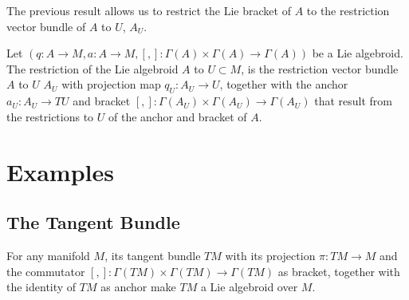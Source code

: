 The previous result allows us to restrict the Lie bracket of $A$ to the restriction vector bundle of $A$ to $U$, $A_U$.

\begin{definition}
Let $(q:A \to M, a: A \to M, [,]:\Gamma(A)\times \Gamma(A) \to \Gamma(A))$ be a Lie algebroid. The restriction of the Lie algebroid $A$ to $U \subset M$, is the restriction vector bundle $A$ to $U$ $A_U$ with projection map $q_U: A_U \to U$, together with the anchor $a_U:A_U \to TU$ and bracket $[,]:\Gamma(A_U)\times \Gamma(A_U) \to \Gamma(A_U)$ that result from the restrictions to $U$ of the anchor and bracket of $A$.
\end{definition}

\begin{definition}

\end{definition}

\begin{definition}

\end{definition}

\begin{definition}[Pullbacks]

\end{definition}

\begin{definition}[Quotients]

\end{definition}

\section{Examples}

\subsection{The Tangent Bundle}

For any manifold $M$, its tangent bundle $TM$ with its projection $\pi:TM \to M$ and the commutator $[,]: \Gamma(TM)\times \Gamma(TM) \to \Gamma(TM)$ as bracket, together with the identity of $TM$ as anchor make $TM$ a Lie algebroid over $M$.


